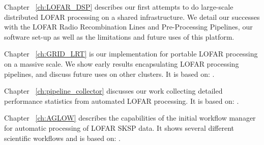 Chapter ~\ref{ch:LOFAR_DSP} describes our first attempts to do large-scale distributed LOFAR processing on a shared infrastructure. We detail our successes with the LOFAR Radio Recombination Lines and Pre-Processing Pipelines, our software set-up as well as the limitations and future uses of this platform.  


Chapter ~\ref{ch:GRID_LRT} is our implementation for portable LOFAR processing on a massive scale. We show early results encapsulating LOFAR processing pipelines, and discuss future uses on other clusters. It is based on:  .

Chapter ~\ref{ch:pipeline_collector} discusses our work collecting detailed performance statistics from automated LOFAR processing. It is based on: .

Chapter ~\ref{ch:AGLOW} describes the capabilities of the initial workflow manager for automatic processing of LOFAR SKSP data. It shows several different scientific workflows and is based on: .

